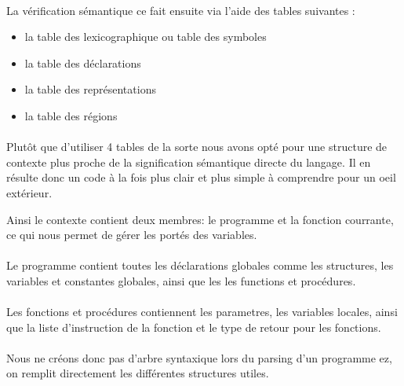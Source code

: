 
\paragraph{}La vérification sémantique ce fait ensuite via l'aide des tables suivantes :

\begin{itemize}
 \item la table des lexicographique ou table des symboles
 \item la table des déclarations
 \item la table des représentations
 \item la table des régions
\end{itemize}

\paragraph{}Plutôt que d'utiliser 4 tables de la sorte nous avons opté pour une structure de contexte
plus proche de la signification sémantique directe du langage.
Il en résulte donc un code à la fois plus clair et plus simple à comprendre pour un oeil extérieur.

Ainsi le contexte contient deux membres: le programme et la fonction courrante, ce qui nous permet de 
gérer les portés des variables.

\paragraph{}Le programme contient toutes les déclarations globales comme les structures, les variables
et constantes globales, ainsi que les les functions et procédures.

\paragraph{}Les fonctions et procédures contiennent les parametres, les variables locales, ainsi que 
la liste d'instruction de la fonction et le type de retour pour les fonctions.

\paragraph{}Nous ne créons donc pas d'arbre syntaxique lors du parsing d'un programme ez, on remplit
directement les différentes structures utiles. 

